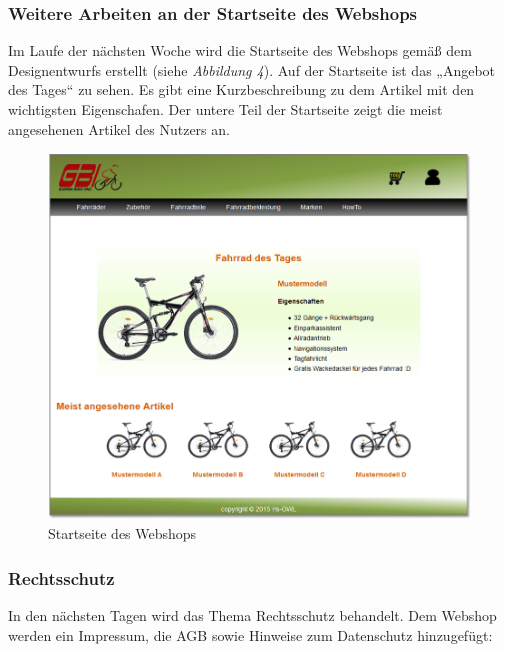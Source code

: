 \subsubsection{Weitere Arbeiten an der Startseite des Webshops}

Im Laufe der nächsten Woche wird die Startseite des Webshops gemäß dem Designentwurfs erstellt (siehe \textit{Abbildung 4}). Auf der Startseite ist das „Angebot des Tages“ zu sehen. Es gibt eine Kurzbeschreibung zu dem Artikel mit den wichtigsten Eigenschafen. Der untere Teil der Startseite zeigt die meist angesehenen Artikel des Nutzers an.

\begin{figure}[H]
\begin{center}

\includegraphics[width=150mm]{Bilder/Abbildung5-StartseiteDesWebshops.png}
\end{center}
\caption{Startseite des Webshops}
\end{figure}


\subsubsection{Rechtsschutz}

In den nächsten Tagen wird das Thema Rechtsschutz behandelt. Dem Webshop werden ein Impressum, die AGB sowie Hinweise zum Datenschutz hinzugefügt:

